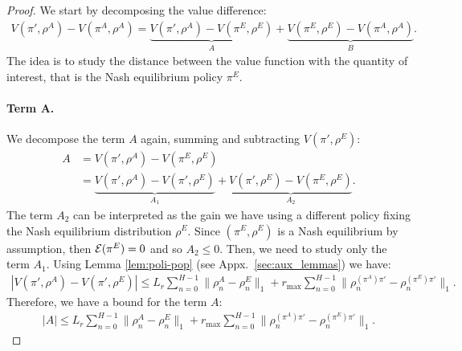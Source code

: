 \documentclass{article}
\begin{document}
\begin{proof}
We start by decomposing the value difference:
\begin{align*}
    V(\pi',\rho^A) - V(\pi^A, \rho^A) = \underbrace{V(\pi',\rho^A) - V(\pi^E, \rho^E)}_{A} + \underbrace{V(\pi^E,\rho^E) - V(\pi^A, \rho^A)}_{B}.
\end{align*}
The idea is to study the distance between the value function with the quantity of interest, that is the Nash equilibrium policy $\pi^E$. 

\paragraph{Term A.}
We decompose the term $A$ again, summing and subtracting $V(\pi',\rho^E)$:
\begin{align}
    A &= V(\pi',\rho^A) - V(\pi^E, \rho^E) \\
    &= \underbrace{V(\pi',\rho^A) - V(\pi', \rho^E)}_{A_1} + \underbrace{V(\pi', \rho^E) - V(\pi^E, \rho^E)}_{A_2}.
\end{align}
The term $A_2$ can be interpreted as the gain we have using a different policy fixing the Nash equilibrium distribution $\rho^E$. Since $(\pi^E, \rho^E)$ is a Nash equilibrium by assumption, then $\mathcal{E}(\pi^E) = 0$ and so $A_2\le 0$. Then, we need to study only the term $A_1$. Using Lemma \ref{lem:poli-pop} (see Appx.~\ref{sec:aux_lemmas}) we have:
\begin{align}
    |V(\pi',\rho^A) - V(\pi', \rho^E)| \le L_r\sum_{n=0}^{H-1}\|\rho^{A}_n - \rho^{E}_n\|_1 + r_{\max}\sum_{n=0}^{H-1} \|\rho^{(\pi^A)\pi'}_n - \rho^{(\pi^E)\pi'}_n\|_1.
\end{align}
Therefore, we have a bound for the term $A$:
\begin{align}
    |A| \le L_r\sum_{n=0}^{H-1}\|\rho^{A}_n - \rho^{E}_n\|_1 + r_{\max}\sum_{n=0}^{H-1} \|\rho^{(\pi^A)\pi'}_n - \rho^{(\pi^E)\pi'}_n\|_1.
\end{align}


\end{proof}
\end{document}
